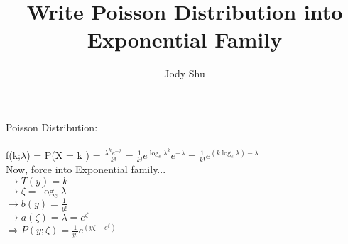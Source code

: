 \documentclass[11pt, oneside]{article}   	%
\title{Write Poisson Distribution into Exponential Family}
\author{Jody Shu}
\begin{document}
\maketitle
\begin{Large}
Poisson Distribution:\\
\\
\hspace{30pt}f(k;$\lambda$) = P(X = k ) = $\frac{\lambda^{k}e^{-\lambda}} {k!}
=\frac{1}{k!} e^{\log_{e}\lambda^{k}}e^{-\lambda}
=\frac{1}{k!} e^{(k\log_{e}\lambda)-\lambda}$\\
Now, force into Exponential family...\\
$\rightarrow T(y)=k$\\
$\rightarrow \zeta = \log_{e}\lambda$\\
$\rightarrow b(y) = \frac{1}{y!}$\\
$\rightarrow a(\zeta)=\lambda=e^{\zeta}$\\
$\Rightarrow P(y;\zeta)=\frac{1}{y!}e^{(y\zeta-e^{\zeta})}$

\end{Large}
\end{document}
